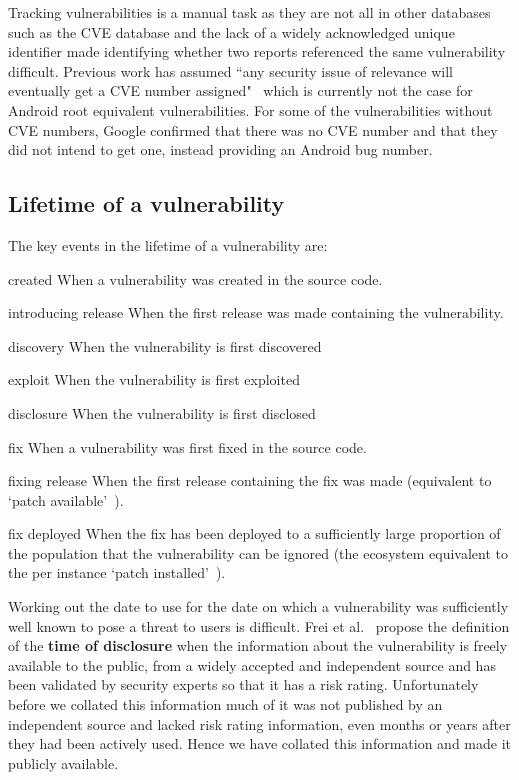 \documentclass[conference,a4paper,twoside]{IEEEtran}
\begin{document}
Tracking vulnerabilities is a manual task as they are not all in other databases such as the CVE database and the lack of a widely acknowledged unique identifier made identifying whether two reports referenced the same vulnerability difficult.
Previous work has assumed ``any security issue of relevance will eventually get a CVE number assigned"~\cite{Frei2010} which is currently not the case for Android root equivalent vulnerabilities.
For some of the vulnerabilities without CVE numbers, Google confirmed that there was no CVE number and that they did not intend to get one, instead providing an Android bug number.


\subsection{Lifetime of a vulnerability}

The key events in the lifetime of a vulnerability are:

\begin{LaTeXdescription}
 \item[created] When a vulnerability was created in the source code.
 \item[introducing release] When the first release was made containing the vulnerability.
 \item[discovery] When the vulnerability is first discovered
 \item[exploit] When the vulnerability is first exploited
 \item[disclosure] When the vulnerability is first disclosed %
 \item[fix] When a vulnerability was first fixed in the source code.
 \item[fixing release] When the first release containing the fix was made (equivalent to `patch available'~\cite{Frei2010}).
 \item[fix deployed] When the fix has been deployed to a sufficiently large proportion of the population that the vulnerability can be ignored (the ecosystem equivalent to the per instance `patch installed'~\cite{Frei2010}).
\end{LaTeXdescription}

Working out the date to use for the date on which a vulnerability was sufficiently well known to pose a threat to users is difficult.
Frei et al.~\cite{Frei2010} propose the definition of the {\bf time of disclosure} when the information about the vulnerability is freely available to the public, from a widely accepted and independent source and has been validated by security experts so that it has a risk rating.
Unfortunately before we collated this information much of it was not published by an independent source and lacked risk rating information, even months or years after they had been actively used.
Hence we have collated this information and made it publicly available.
\end{document}
